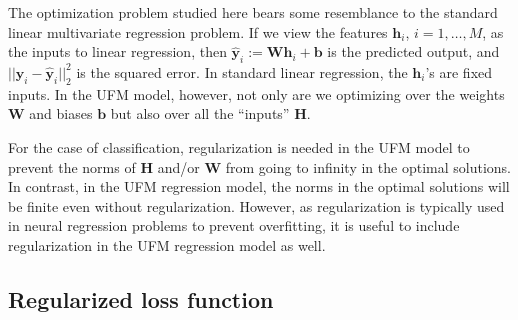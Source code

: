 \documentclass{article}
\theoremstyle{plain}
\theoremstyle{definition}
\theoremstyle{remark}
\newcommand{\bW}{{\mathbf W}}
\newcommand{\bH}{{\mathbf H}}
\newcommand{\bh}{{\mathbf h}}
\newcommand{\bhi}{{\mathbf h}_i}
\newcommand{\by}{{\mathbf y}}
\newcommand{\bb}{{\mathbf b}}
\newcommand{\byi}{{\mathbf y}_i}
\begin{document}
The optimization problem studied here bears some resemblance to the standard linear multivariate regression problem. If we view the features $\bh_i$, $i=1,\ldots,M$, as the inputs to linear regression, then $\hat{\by}_i := \bW \bh_i + \bb$ is the predicted output, and $||\byi -  \hat{\by}_i||_2^2$ is the squared error. In standard linear regression, the $\bhi$'s are fixed inputs. In the UFM model, however, not only are we optimizing over the weights $\bW$ and biases $\bb$ but also  over all the ``inputs'' $\bH$. 

For the case of classification, regularization is needed in the UFM model to prevent the norms of $\bH$ and/or $\bW$ from going to infinity in the optimal solutions. In contrast, in the UFM regression model, the norms in the optimal solutions will be finite even without regularization. However, as regularization is typically used in neural regression problems to prevent overfitting, it is useful to include regularization in the UFM regression model as well. 

\subsection{Regularized loss function}
\end{document}
